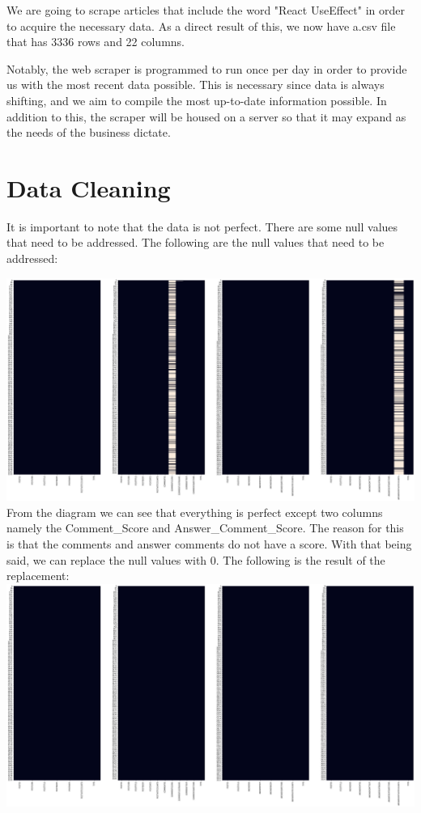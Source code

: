 We are going to scrape articles that include the word "React UseEffect" in order to acquire the necessary data. As a direct result of this, we now have a.csv file that has 3336 rows and 22 columns.

Notably, the web scraper is programmed to run once per day in order to provide us with the most recent data possible. This is necessary since data is always shifting, and we aim to compile the most up-to-date information possible. In addition to this, the scraper will be housed on a server so that it may expand as the needs of the business dictate.


\section{Data Cleaning} \label{data-cleaning}
It is important to note that the data is not perfect. There are some null values that need to be addressed. The following are the null values that need to be addressed:

\noindent  \includegraphics[scale=0.25, angle=90]{null-values-1.png}\\

From the diagram we can see that everything is perfect except two columns namely the Comment\_Score and Answer\_Comment\_Score. The reason for this is that the comments and answer comments do not have a score. With that being said, we can replace the null values with 0. The following is the result of the replacement:
\includegraphics[scale=0.25, angle=90]{null-values-2.png}\\

